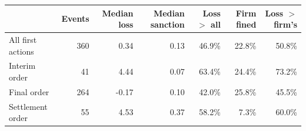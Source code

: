 \begin{tabular*}{\textwidth}[]{l@{\extracolsep\fill}rrrrrr}
\toprule
 & Events & Median loss & Median sanction & Loss $>$ all & Firm fined & Loss $>$ firm's\\
\midrule
All first actions & 360 & 0.34 & 0.13 & 46.9\% & 22.8\% & 50.8\%\\
Interim order & 41 & 4.44 & 0.07 & 63.4\% & 24.4\% & 73.2\%\\
Final order & 264 & -0.17 & 0.10 & 42.0\% & 25.8\% & 45.5\%\\
Settlement order & 55 & 4.53 & 0.37 & 58.2\% & 7.3\% & 60.0\%\\
\bottomrule
\end{tabular*}
